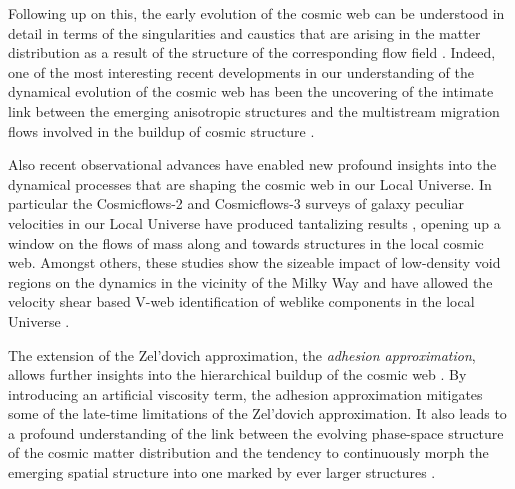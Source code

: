 \documentclass[useAMS,usenatbib]{mnras}
\begin{document}
Following up on this, the early evolution of the cosmic web can be understood in detail in terms of the singularities and caustics that 
are arising in the matter distribution as a result of the structure of the corresponding flow field \citep[see][]{shandzeld1989,hidding2014}. 
Indeed, one of the most interesting recent developments in our understanding of the dynamical evolution of the cosmic web has been the 
uncovering of the intimate link between the emerging anisotropic structures and the multistream migration flows involved in the buildup of 
cosmic structure \citep[][]{shandarin2011,shandarin2012,falck2012,neyrinck2012,abel2012}. 

Also recent observational advances have enabled new 
profound insights into the dynamical processes that are shaping the cosmic web in our Local Universe. In particular the Cosmicflows-2 and 
Cosmicflows-3 surveys of galaxy peculiar velocities in our Local Universe have produced tantalizing results \citep{courtois2013,tully2014}, opening up a window on the flows of mass along and towards structures in the local cosmic web. Amongst others, these studies show 
the sizeable impact of low-density void regions on the dynamics in the vicinity of the Milky Way and have allowed 
the velocity shear based V-web identification of weblike components in the local Universe \citep{2015MNRAS.452.1052L,2015ApJ...812...17P,hoffman2017}. 

The extension of the Zel'dovich approximation, the \emph{adhesion approximation}, allows further insights into the hierarchical buildup 
of the cosmic web \citep{gurbatov1989,kofman1990,kofman1992,hidding2012}. By introducing an artificial viscosity term, the adhesion 
approximation mitigates some of the late-time limitations of the Zel'dovich approximation. It also leads to a profound understanding 
of the link between the evolving phase-space structure of the cosmic matter distribution and the tendency to continuously morph the 
emerging spatial structure into one marked by ever larger structures \citep[see also][for a review of analytical extensions to the Zel'dovich approximation]{1995PhR...262....1S}. 
\end{document}
